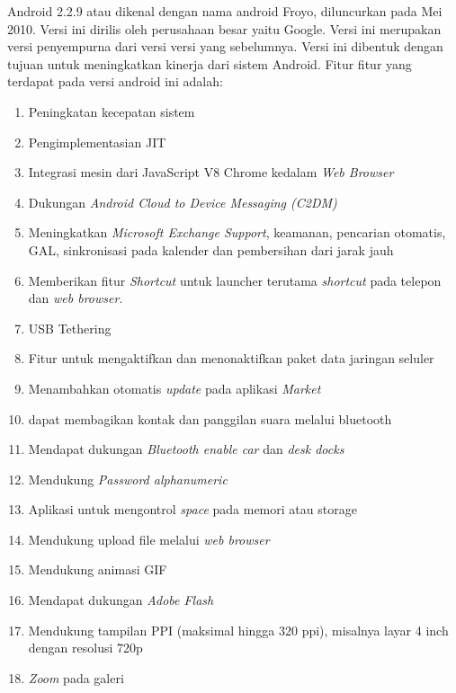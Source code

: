\begin{enumerate}
Android 2.2.9 atau dikenal dengan nama android Froyo, diluncurkan pada Mei 2010. Versi ini dirilis oleh perusahaan besar yaitu Google. Versi ini merupakan versi penyempurna dari versi versi yang sebelumnya. Versi ini dibentuk dengan tujuan untuk meningkatkan kinerja dari sistem Android. Fitur fitur yang terdapat pada versi android ini adalah: 
\begin{enumerate}
    \item Peningkatan kecepatan sistem
    \item Pengimplementasian JIT
    \item Integrasi mesin dari JavaScript V8 Chrome kedalam \textit{Web Browser}
    \item Dukungan \textit{Android Cloud to Device Messaging (C2DM) }
    \item Meningkatkan \textit{Microsoft Exchange Support}, keamanan, pencarian otomatis, GAL, sinkronisasi pada kalender dan pembersihan dari jarak jauh
    \item Memberikan fitur \textit{Shortcut} untuk launcher terutama \textit{shortcut} pada telepon dan \textit{web browser}.
    \item USB Tethering
    \item Fitur untuk mengaktifkan dan menonaktifkan paket data jaringan seluler
    \item Menambahkan otomatis \textit{update} pada aplikasi \textit{Market}
    \item dapat membagikan kontak dan panggilan suara melalui bluetooth
    \item Mendapat dukungan \textit{Bluetooth enable car} dan  \textit{desk docks}
    \item Mendukung \textit{Password alphanumeric}
    \item Aplikasi untuk mengontrol \textit{space} pada memori atau storage
    \item Mendukung upload file melalui \textit{web browser}
    \item Mendukung animasi GIF
    \item Mendapat dukungan \textit{Adobe Flash}
    \item Mendukung tampilan PPI (maksimal hingga 320 ppi), misalnya layar 4 inch dengan resolusi 720p
    \item \textit{Zoom} pada galeri
\end{enumerate}


\end{enumerate}
